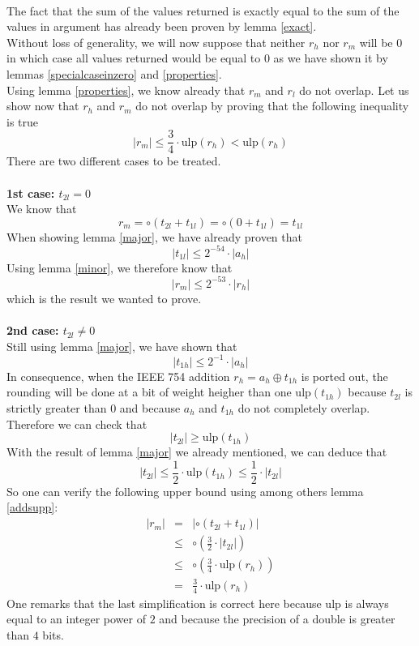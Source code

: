 \documentclass[a4paper,10pt,twoside]{article}
\newenvironment{proof}[1][Proof]{\begin{trivlist}
\item[\hskip \labelsep {\bfseries #1}]}{\end{trivlist}}
\newcommand{\qed}{\nobreak \ifvmode \relax \else \ifdim \lastskip<1.5em \hskip-\lastskip
\hskip1.5em plus0em minus0.5em \fi \nobreak \vrule height0.75em width0.5em depth0.25em\fi}
\newcommand{\hi}{\ensuremath{\mathit{h}}}
\newcommand{\mi}{\ensuremath{\mathit{m}}}
\newcommand{\lo}{\ensuremath{\mathit{l}}}
\newcommand{\mUlp}{\ensuremath{\mathrm{ulp}}}
\begin{document}
\begin{proof} ~ \\
The fact that the sum of the values returned is exactly equal to the sum of
the values in argument has already been proven by lemma \ref{exact}.\\
Without loss of generality, we will now suppose that neither $r_\hi$ nor
$r_\mi$ will be $0$ in which case all values returned would be equal to $0$
as we have shown it by lemmas \ref{specialcaseinzero} and \ref{properties}.\\
Using lemma \ref{properties}, we know already that $r_\mi$ and $r_\lo$ do not
overlap.
Let us show now that $r_\hi$ and $r_\mi$ do not overlap
by proving that the following inequality is true
$$\left \vert r_\mi \right \vert \leq \frac{3}{4} \cdot \mUlp\left( r_\hi
\right) < \mUlp\left( r_\hi \right)$$
There are two different cases to be treated. \\ ~ \\
{\bf 1st case: $t_{2\lo} = 0$} \\
We know that
$$r_\mi = \circ \left( t_{2\lo} + t_{1\lo} \right) = \circ \left( 0 + t_{1\lo} \right) = t_{1\lo}$$
When showing lemma \ref{major}, we have already proven that
$$\left \vert t_{1\lo} \right \vert \leq 2^{-54} \cdot \left \vert a_\hi \right \vert$$
Using lemma \ref{minor}, we therefore know that
$$\left \vert r_\mi \right \vert \leq 2^{-53} \cdot \left \vert r_\hi \right \vert$$
which is the result we wanted to prove.\\ ~ \\
{\bf 2nd case: $t_{2\lo} \not = 0$} \\
Still using lemma \ref{major}, we have shown that
$$\left \vert t_{1\hi} \right \vert \leq 2^{-1} \cdot \left \vert a_\hi \right \vert$$
In consequence, when the IEEE 754 \cite{IEEE754} addition $r_\hi = a_\hi \oplus t_{1\hi}$ is
ported out, the rounding will be done at a bit of weight heigher than one
$\mUlp\left(t_{1\hi} \right)$ because $t_{2\lo}$ is strictly greater than $0$
and because $a_\hi$ and $t_{1\hi}$
do not completely overlap. Therefore we can check that
$$\left \vert t_{2\lo} \right \vert \geq \mUlp\left( t_{1\hi} \right)$$
With the result of lemma \ref{major} we already mentioned, we can deduce that
$$\left \vert t_{2\lo} \right \vert \leq \frac{1}{2} \cdot \mUlp\left( t_{1\hi} \right) \leq \frac{1}{2} \cdot \left \vert t_{2\lo} \right \vert$$
So one can verify the following upper bound using among others lemma \ref{addsupp}:
\begin{eqnarray*}
\left \vert r_\mi \right \vert & = & \left \vert \circ \left(t_{2\lo} + t_{1\lo} \right) \right \vert \\
& \leq & \circ \left( \frac{3}{2} \cdot \left \vert t_{2\lo} \right \vert \right) \\
& \leq & \circ \left( \frac{3}{4} \cdot \mUlp \left( r_\hi \right) \right) \\
& = & \frac{3}{4} \cdot \mUlp \left( r_\hi \right)
\end{eqnarray*}
One remarks that the last simplification is correct here because $\mUlp$ is
always equal to an integer power of $2$ and because the precision of a double
is greater than $4$ bits.\qed
\end{proof}
\end{document}

